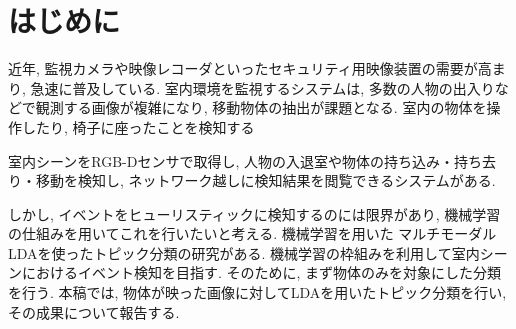 \section{はじめに}

近年, 監視カメラや映像レコーダといったセキュリティ用映像装置の需要が高まり, 急速に普及している. 
室内環境を監視するシステムは, 多数の人物の出入りなどで観測する画像が複雑になり, 移動物体の抽出が課題となる. 
室内の物体を操作したり, 椅子に座ったことを検知する
\par
室内シーンをRGB-Dセンサで取得し, 人物の入退室や物体の持ち込み・持ち去り・移動を検知し, 
ネットワーク越しに検知結果を閲覧できるシステム\cite{ms}がある.

しかし, イベントをヒューリスティックに検知するのには限界があり, 
機械学習の仕組みを用いてこれを行いたいと考える.
機械学習を用いた
マルチモーダルLDAを使ったトピック分類の研究\cite{nagai2014}がある.
機械学習の枠組みを利用して室内シーンにおけるイベント検知を目指す.
そのために, まず物体のみを対象にした分類を行う.
本稿では, 物体が映った画像に対してLDAを用いたトピック分類を行い, その成果について報告する.



